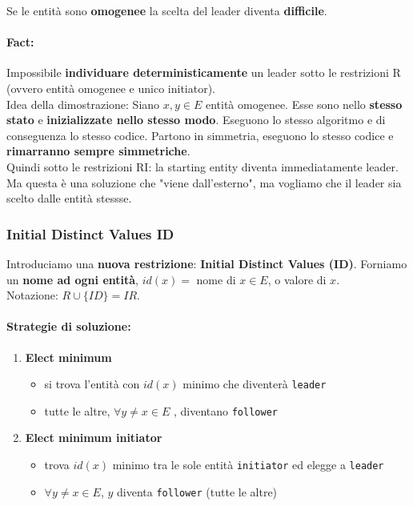 Se le entità sono \textbf{omogenee} la scelta del leader diventa \textbf{difficile}.\\

\paragraph{Fact:} Impossibile \textbf{individuare deterministicamente} un leader sotto le restrizioni R (ovvero entità omogenee e unico initiator).\\

Idea della dimostrazione: Siano $x,y \in E$ entità omogenee. Esse sono nello \textbf{stesso stato} e \textbf{inizializzate nello stesso modo}. Eseguono lo stesso algoritmo e di conseguenza lo stesso codice. Partono in simmetria, eseguono lo stesso codice e \textbf{rimarranno sempre simmetriche}.\\

Quindi sotto le restrizioni RI: la starting entity diventa immediatamente leader.\\
Ma questa è una soluzione che "viene dall'esterno", ma vogliamo che il leader sia scelto dalle entità stessse.\\

\subsubsection{Initial Distinct Values ID}

Introduciamo una \textbf{nuova restrizione}: \textbf{Initial Distinct Values (ID)}. Forniamo un \textbf{nome ad ogni entità}, $id(x) =$ nome di $x \in E$, o valore di $x$.\\

Notazione: $R \cup \{ID\} = IR$.\\

\newpage

\paragraph{Strategie di soluzione:}
\begin{enumerate}
	\item \textbf{Elect minimum} 
	\begin{itemize}
		\item si trova l'entità con $id(x)$ minimo che diventerà \texttt{leader}
		\item tutte le altre, $\forall y \neq x \in E$ , diventano \texttt{follower}
	\end{itemize}
	\nn
	
	\item \textbf{Elect minimum initiator}
	\begin{itemize}
		\item trova $id(x)$ minimo tra le sole entità \texttt{initiator} ed elegge a \texttt{leader}
		\item $\forall y \neq x \in E$, $y$ diventa \texttt{follower} (tutte le altre)
	\end{itemize}
\end{enumerate} 


